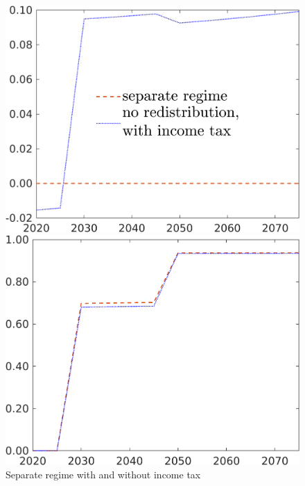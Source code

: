 \begin{figure}[h!!]
	\centering
	\caption{Separate regime with and without income tax}\label{fig:comp_nored_pol}
	
	\begin{minipage}[]{0.32\textwidth}
		\includegraphics[width=1\textwidth]{../../codding_model/own_basedOnFried/optimalPol_190722_tidiedUp/figures/all_July22/taul_DDCompEffOPT_T_NoTaus_pol3_spillover0_noskill0_sep1_xgrowth0_etaa0.79_lgd1_lff0.png}
	\end{minipage}
	\begin{minipage}[]{0.32\textwidth}
		\includegraphics[width=1\textwidth]{../../codding_model/own_basedOnFried/optimalPol_190722_tidiedUp/figures/all_July22/tauf_DDCompEffOPT_T_NoTaus_pol3_spillover0_noskill0_sep1_xgrowth0_etaa0.79_lgd0_lff0.png}

\end{minipage}
\end{figure}
